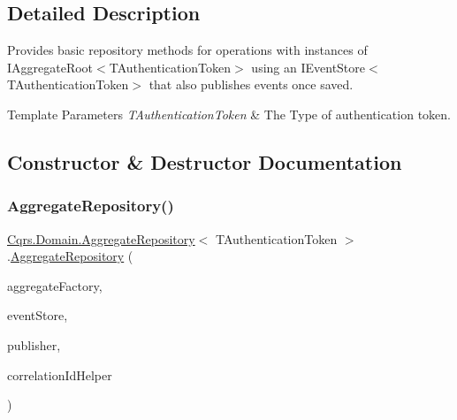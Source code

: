 \subsection{Detailed Description}
Provides basic repository methods for operations with instances of I\+Aggregate\+Root$<$\+T\+Authentication\+Token$>$ using an I\+Event\+Store$<$\+T\+Authentication\+Token$>$ that also publishes events once saved. 


\begin{DoxyTemplParams}{Template Parameters}
{\em T\+Authentication\+Token} & The Type of authentication token.\\
\hline
\end{DoxyTemplParams}


\subsection{Constructor \& Destructor Documentation}
\mbox{\label{classCqrs_1_1Domain_1_1AggregateRepository_ae4a6c96b10c536a0df6a381659f87744_ae4a6c96b10c536a0df6a381659f87744}} 
\subsubsection{\texorpdfstring{Aggregate\+Repository()}{AggregateRepository()}}
{\footnotesize\ttfamily \hyperlink{classCqrs_1_1Domain_1_1AggregateRepository}{Cqrs.\+Domain.\+Aggregate\+Repository}$<$ T\+Authentication\+Token $>$.\hyperlink{classCqrs_1_1Domain_1_1AggregateRepository}{Aggregate\+Repository} (\begin{DoxyParamCaption}\item[{\hyperlink{interfaceCqrs_1_1Domain_1_1Factories_1_1IAggregateFactory}{I\+Aggregate\+Factory}}]{aggregate\+Factory,  }\item[{\hyperlink{interfaceCqrs_1_1Events_1_1IEventStore}{I\+Event\+Store}$<$ T\+Authentication\+Token $>$}]{event\+Store,  }\item[{\hyperlink{interfaceCqrs_1_1Events_1_1IEventPublisher}{I\+Event\+Publisher}$<$ T\+Authentication\+Token $>$}]{publisher,  }\item[{I\+Correlation\+Id\+Helper}]{correlation\+Id\+Helper }\end{DoxyParamCaption})}



